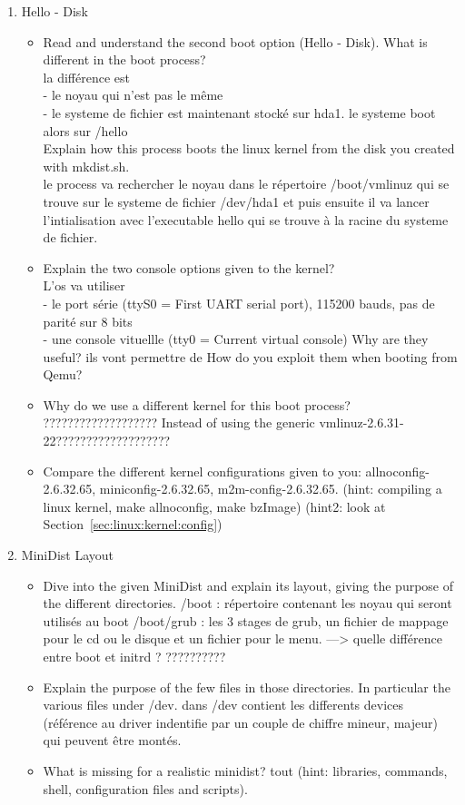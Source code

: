 \documentclass[10]{article}
\begin{document}
\begin{enumerate}
\item Hello - Disk
\begin{itemize}
\item Read and understand the second boot option (Hello - Disk).
What is different in the boot process? \\
la diff\'erence est \\
	- le noyau qui n'est pas le m\^eme\\
	- le systeme de fichier est maintenant stock\'e sur hda1. le systeme boot alors sur /hello\\
Explain how this process boots the linux kernel from the disk you created with mkdist.sh.\\
le process va rechercher le noyau dans le r\'epertoire /boot/vmlinuz 
qui se trouve sur le systeme de fichier /dev/hda1 et puis ensuite il va  lancer l'intialisation avec l'executable hello qui se trouve \`a la racine du systeme de fichier.\\
\item Explain the two console options given to the kernel?\\
L'os va utiliser \\
	- le port s\'erie (ttyS0 = First UART serial port), 115200 bauds, pas de parit\'e sur 8 bits\\
	- une console vituellle (tty0 = Current virtual console)
Why are they useful?
ils vont permettre de 
 How do you exploit them when booting from Qemu?
\item Why do we use a different kernel for this boot process?
???????????????????
Instead of using the generic vmlinuz-2.6.31-22???????????????????
\item Compare the different kernel configurations given to you:
allnoconfig-2.6.32.65, miniconfig-2.6.32.65, m2m-config-2.6.32.65.
(hint: compiling a linux kernel, make allnoconfig, make bzImage)
(hint2: look at Section~\ref{sec:linux:kernel:config})

\end{itemize}

\item MiniDist Layout
\begin{itemize}
\item Dive into the given MiniDist and explain its layout,
giving the purpose of the different directories.
/boot : r\'epertoire contenant les noyau qui seront utilis\'es au boot
/boot/grub : les 3 stages de grub, un fichier de mappage pour le cd ou le disque et un fichier pour le menu. 
---> quelle diff\'erence entre boot et initrd ? ??????????

\item Explain the purpose of the few files in those directories.
In particular the various files under /dev.
dans /dev contient les differents devices (r\'ef\'erence au driver indentifie par un couple de chiffre mineur, majeur) qui peuvent être mont\'es.

\item What is missing for a realistic minidist?
tout 
(hint: libraries, commands, shell, configuration files and scripts).
\end{itemize}

\end{enumerate}
\end{document}
